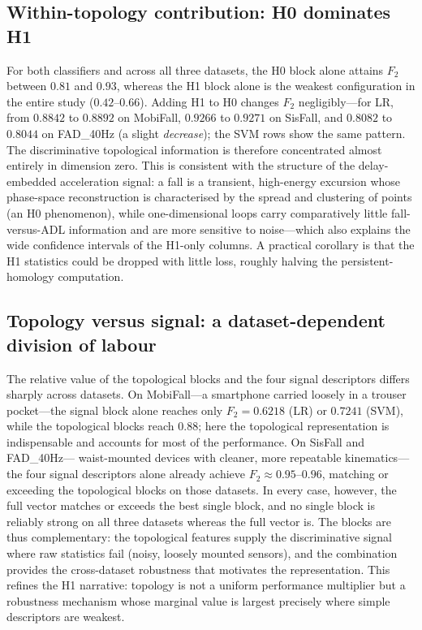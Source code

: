 \documentclass[onluarkali,ingilizce,yukseklisans,karton,LisansustuEgitim]{itutez}
\providecommand{\1}{\mathbf{1}}
\begin{document}
\subsection{Within-topology contribution: H0 dominates H1}

For both classifiers and across all three datasets, the H0 block alone attains $F_2$
between $0.81$ and $0.93$, whereas the H1 block alone is the weakest configuration in
the entire study ($0.42$--$0.66$).  Adding H1 to H0 changes $F_2$ negligibly---for LR,
from $0.8842$ to $0.8892$ on MobiFall, $0.9266$ to $0.9271$ on SisFall, and $0.8082$
to $0.8044$ on FAD\_40Hz (a slight \emph{decrease}); the SVM rows show the same pattern.
The discriminative topological information is therefore concentrated almost entirely in
dimension zero.  This is consistent with the structure of the delay-embedded
acceleration signal: a fall is a transient, high-energy excursion whose phase-space
reconstruction is characterised by the spread and clustering of points (an H0
phenomenon), while one-dimensional loops carry comparatively little fall-versus-ADL
information and are more sensitive to noise---which also explains the wide confidence
intervals of the H1-only columns.  A practical corollary is that the H1 statistics
could be dropped with little loss, roughly halving the persistent-homology computation.

\subsection{Topology versus signal: a dataset-dependent division of labour}

The relative value of the topological blocks and the four signal descriptors differs
sharply across datasets.  On MobiFall---a smartphone carried loosely in a trouser
pocket---the signal block alone reaches only $F_2 = 0.6218$ (LR) or $0.7241$ (SVM),
while the topological blocks reach $0.88$; here the topological representation is
indispensable and accounts for most of the performance.  On SisFall and FAD\_40Hz---%
waist-mounted devices with cleaner, more repeatable kinematics---the four signal
descriptors alone already achieve $F_2 \approx 0.95$--$0.96$, matching or exceeding the
topological blocks on those datasets.  In every case, however, the full vector matches
or exceeds the best single block, and no single block is reliably strong on all three
datasets whereas the full vector is.  The blocks are thus complementary: the
topological features supply the discriminative signal where raw statistics fail (noisy,
loosely mounted sensors), and the combination provides the cross-dataset robustness
that motivates the representation.  This refines the H1 narrative: topology is not a
uniform performance multiplier but a robustness mechanism whose marginal value is
largest precisely where simple descriptors are weakest.
\end{document}
